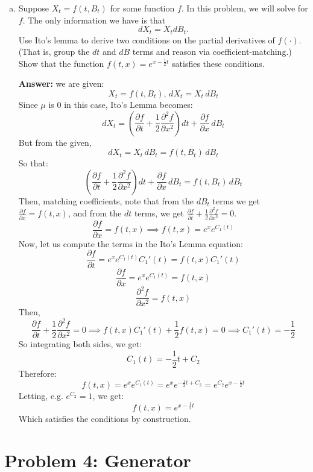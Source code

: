 \documentclass[11pt]{extarticle}
\theoremstyle{plain}
\theoremstyle{definition}
\begin{document}
\begin{enumerate}[(a)]
\item Suppose $X_t = f(t, B_t)$ for some function $f$. In this problem, we will solve for $f$. The only information we have is that 
\begin{equation*}
	dX_t = X_t dB_t.
\end{equation*}
Use Ito's lemma to derive two conditions on the partial derivatives of $f(\cdot)$. (That is, group the $dt$ and $dB$ terms and reason via coefficient-matching.) Show that the function $f(t, x) = e^{x - \frac{1}{2}t}$ satisfies these conditions.

\textbf{Answer:} we are given:
\[
X_t = f(t, B_t) \text{, \ }dX_t = X_t \, dB_t
\]
Since $\mu$ is 0 in this case, Ito's Lemma becomes:
\[
dX_t = \left( \frac{\partial f}{\partial t} + \frac{1}{2} \frac{\partial^2 f}{\partial x^2} \right) dt + \frac{\partial f}{\partial x} \, dB_t
\]
But from the given, 
\[
dX_t = X_t \, dB_t = f(t, B_t) \, dB_t
\]
So that:
\[
\left( \frac{\partial f}{\partial t} + \frac{1}{2} \frac{\partial^2 f}{\partial x^2} \right) dt + \frac{\partial f}{\partial x} \, dB_t = f(t, B_t) \, dB_t
\]
Then, matching coefficients, note that from the \( dB_t \) terms we get $\frac{\partial f}{\partial x} = f(t, x)$, and from the \( dt \) terms, we get $\frac{\partial f}{\partial t} + \frac{1}{2} \frac{\partial^2 f}{\partial x^2} = 0$.
\[
\frac{\partial f}{\partial x} = f(t, x) \implies f(t, x) = e^{x} e^{C_1(t)}
\]
Now, let us compute the terms in the Ito's Lemma equation:
 \[
  \frac{\partial f}{\partial t} = e^{x} e^{C_1(t)} C_1'(t) = f(t, x) C_1'(t)
  \]
  \[
  \frac{\partial f}{\partial x} = e^{x} e^{C_1(t)} = f(t, x)
  \]
  \[
  \frac{\partial^2 f}{\partial x^2} = f(t, x)
  \]
Then,
\[
\frac{\partial f}{\partial t} + \frac{1}{2} \frac{\partial^2 f}{\partial x^2} = 0
\implies
f(t, x) C_1'(t) + \frac{1}{2} f(t, x) = 0
\implies 
C_1'(t) = -\frac{1}{2}
\]
So integrating both sides, we get: 
\[
C_1(t) = -\frac{1}{2} t + C_2
\]
Therefore:
\[
f(t, x) = e^{x} e^{C_1(t)} = e^{x} e^{ -\frac{1}{2} t + C_2 } = e^{C_2} e^{ x - \frac{1}{2} t }
\]
Letting, e.g. $e^{C_2}=1$, we get:
\[
f(t, x) = e^{ x - \frac{1}{2} t }
\]
Which satisfies the conditions by construction.
\end{enumerate}


\vspace{5mm}
\section*{Problem 4: Generator}
\end{document}
